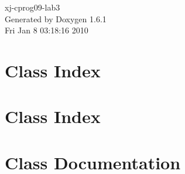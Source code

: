 \documentclass[a4paper]{book}
\begin{document}
\hypersetup{pageanchor=false}
\begin{titlepage}
\vspace*{7cm}
\begin{center}
{\Large xj-\/cprog09-\/lab3 }\\
\vspace*{1cm}
{\large Generated by Doxygen 1.6.1}\\
\vspace*{0.5cm}
{\small Fri Jan 8 03:18:16 2010}\\
\end{center}
\end{titlepage}
\clearemptydoublepage
{}
\tableofcontents
\clearemptydoublepage
{}
\hypersetup{pageanchor=true}
\chapter{Class Index}

\chapter{Class Index}

\chapter{Class Documentation}

























\printindex
\end{document}

